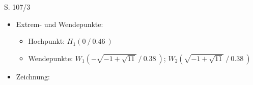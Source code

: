 \begin{Exercise}{S. 107/3}{}
\begin{enumerate}
\begin{enumerate}[label=\alph*),leftmargin=*]
{\begin{itemize}[leftmargin=*]
{                    $\Rightarrow \qquad G_{f}$ ist linksgekrümmt in $\left] \ -\infty; -\sqrt{-1 + \sqrt{11}} \ \right]$ sowie $\left[ \ \sqrt{-1 + \sqrt{11}}; +\infty \ \right[$ \\[1.0ex]
                    $\Rightarrow \qquad G_{f}$ ist rechtsgekrümmt in $\left[ \ -\sqrt{-1 + \sqrt{11}}; \sqrt{-1 + \sqrt{11}} \ \right]$\\[-2.0ex]
                    }
                \item Extrem- und Wendepunkte: \\[-3.0ex]{
                    \begin{itemize}
                        \item Hochpunkt: \quad $H_{1}(0 \ / \ \SI{0.46}{})$
                        \item Wendepunkte: \quad $W_{1}(-\sqrt{-1 + \sqrt{11}} \ / \ \SI{0.38}{})$; \quad $W_{2}(\sqrt{-1 + \sqrt{11}} \ / \ \SI{0.38}{})$
                    \end{itemize}
                }
                \item Zeichnung: \\[-2.0ex]{
                    }
\end{itemize}}
\end{enumerate}
\end{enumerate}
\end{Exercise}
